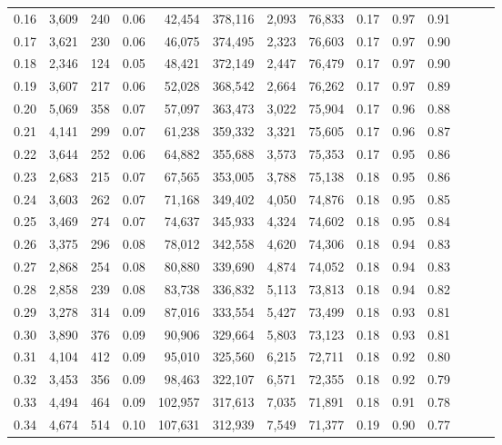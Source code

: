 \begin{tabular}{rrrrrrrrrrrrrr}
0.16 &  3,609 &    240 &  0.06 &   42,454 &  378,116 &   2,093 &  76,833 &  0.17 &  0.97 &      0.91 \\
0.17 &  3,621 &    230 &  0.06 &   46,075 &  374,495 &   2,323 &  76,603 &  0.17 &  0.97 &      0.90 \\
0.18 &  2,346 &    124 &  0.05 &   48,421 &  372,149 &   2,447 &  76,479 &  0.17 &  0.97 &      0.90 \\
0.19 &  3,607 &    217 &  0.06 &   52,028 &  368,542 &   2,664 &  76,262 &  0.17 &  0.97 &      0.89 \\
0.20 &  5,069 &    358 &  0.07 &   57,097 &  363,473 &   3,022 &  75,904 &  0.17 &  0.96 &      0.88 \\
0.21 &  4,141 &    299 &  0.07 &   61,238 &  359,332 &   3,321 &  75,605 &  0.17 &  0.96 &      0.87 \\
0.22 &  3,644 &    252 &  0.06 &   64,882 &  355,688 &   3,573 &  75,353 &  0.17 &  0.95 &      0.86 \\
0.23 &  2,683 &    215 &  0.07 &   67,565 &  353,005 &   3,788 &  75,138 &  0.18 &  0.95 &      0.86 \\
0.24 &  3,603 &    262 &  0.07 &   71,168 &  349,402 &   4,050 &  74,876 &  0.18 &  0.95 &      0.85 \\
0.25 &  3,469 &    274 &  0.07 &   74,637 &  345,933 &   4,324 &  74,602 &  0.18 &  0.95 &      0.84 \\
0.26 &  3,375 &    296 &  0.08 &   78,012 &  342,558 &   4,620 &  74,306 &  0.18 &  0.94 &      0.83 \\
0.27 &  2,868 &    254 &  0.08 &   80,880 &  339,690 &   4,874 &  74,052 &  0.18 &  0.94 &      0.83 \\
0.28 &  2,858 &    239 &  0.08 &   83,738 &  336,832 &   5,113 &  73,813 &  0.18 &  0.94 &      0.82 \\
0.29 &  3,278 &    314 &  0.09 &   87,016 &  333,554 &   5,427 &  73,499 &  0.18 &  0.93 &      0.81 \\
0.30 &  3,890 &    376 &  0.09 &   90,906 &  329,664 &   5,803 &  73,123 &  0.18 &  0.93 &      0.81 \\
0.31 &  4,104 &    412 &  0.09 &   95,010 &  325,560 &   6,215 &  72,711 &  0.18 &  0.92 &      0.80 \\
0.32 &  3,453 &    356 &  0.09 &   98,463 &  322,107 &   6,571 &  72,355 &  0.18 &  0.92 &      0.79 \\
0.33 &  4,494 &    464 &  0.09 &  102,957 &  317,613 &   7,035 &  71,891 &  0.18 &  0.91 &      0.78 \\
0.34 &  4,674 &    514 &  0.10 &  107,631 &  312,939 &   7,549 &  71,377 &  0.19 &  0.90 &      0.77 \\

\end{tabular}
